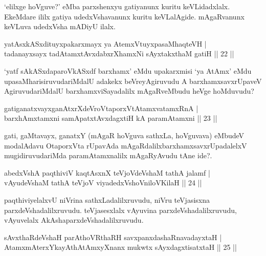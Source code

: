 \begin{artha}
`elilxge hoVguve?' eMba parxshenxyu gatiyanunx kuritu keVLidadxlalx. EkeMdare ililx gatiya udedxVshavanunx kuritu keVLalAgide. mAgaRvanunx keVLuva udedxVsha mADiyU ilalx.
\end{artha}


\begin{shl}
yatAsxkASxdituyxpakarxmayx ya AtemxVtuyxpasaMhaqteVH |\\
tadanayxsayx tadAtamxtAvxdabxrXhamxNi sAyxtakxthaM gatiH \hfill || 22 || 
\end{shl}

\begin{artha}
`yatf sAkASxdaparoVkASxdf barxhamx' eMdu upakarxmisi `ya AtAmx' eMdu upasaMharisiruvudariMdalU adakekx beVreyAgiruvudu A barxhamxsavxrUpaveV AgiruvudariMdalU barxhamxviSayadalilx mAgaRveMbudu heVge hoMduvudu?
\end{artha}

\begin{shl}
gatiganatxvayxganAtxrXdeVroVtaporxVtAtamxvatamxRnA |\\
barxhAmxtamxni samApatxtAvxdagxtiH kA paramAtamxni \hfill || 23 || 
\end{shl}

\begin{artha}
gati, gaMtavayx, ganatxY (mAgaR hoVguva sathxLa, hoVguvava) eMbudeV modalAdavu OtaporxVta rUpavAda mAgaRdalilx\break barxhamxsavxrUpadalelxV mugidiruvudariMda paramAtamxnalilx mAgaR\break yAvudu tAne ide?.
\end{artha}


\begin{shl}
abedxVshA paqthiviV kaqtAsxnX teVjoVdeVshaM tathA jalamf |\\
vAyudeVshaM tathA teVjoV viyadedxVshoV\s niloV\s KilaH \hfill || 24 || 
\end{shl}

\begin{artha}
paqthiviyelalxvU niVrina sathxLadalilxruvudu, niVru teVjasisxna parxdeVshadalilxruvudu. teVjasesxlalx vAyuvina parxdeVshadalilxruvudu, vAyuvelalx AkAshaparxdeVshadalilxruvudu.
\end{artha}

\begin{shl}
sAvxthaRdeVshaH parAthoVR\s thaRH savxpanxdashaRnavadayxtaH |\\
AtamxmAterxYkayAthAtAmxyXnanx mukwtx sAyxdagxtisatxtaH \hfill || 25 || 
\end{shl}

